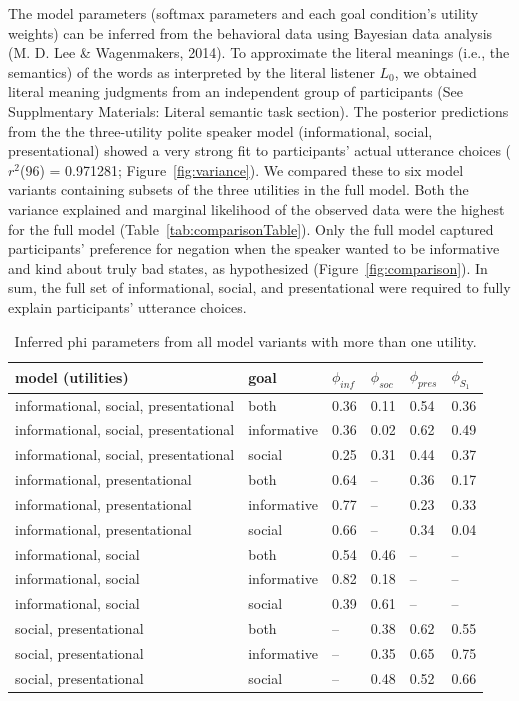 \documentclass[oneside]{report}
\begin{document}
The model parameters (softmax parameters and each goal condition's
utility weights) can be inferred from the behavioral data using Bayesian
data analysis (M. D. Lee \& Wagenmakers, 2014). To approximate the
literal meanings (i.e., the semantics) of the words as interpreted by
the literal listener \(L_0\), we obtained literal meaning judgments from
an independent group of participants (See Supplmentary Materials:
Literal semantic task section). The posterior predictions from the the
three-utility polite speaker model (informational, social,
presentational) showed a very strong fit to participants' actual
utterance choices (\(r^2\)(96) = 0.971281; Figure~\ref{fig:variance}).
We compared these to six model variants containing subsets of the three
utilities in the full model. Both the variance explained and marginal
likelihood of the observed data were the highest for the full model
(Table~\ref{tab:comparisonTable}). Only the full model captured
participants' preference for negation when the speaker wanted to be
informative and kind about truly bad states, as hypothesized
(Figure~\ref{fig:comparison}). In sum, the full set of informational,
social, and presentational were required to fully explain participants'
utterance choices.
\begin{table}[t]

\caption[Inferred phi parameters from model variants.]{\label{tab:phi}Inferred phi parameters from all model variants with more than one utility.}
\centering
\begin{tabular}{llllll}
\toprule
\textbf{model (utilities)} & \textbf{goal} & \textbf{$\phi_{inf}$} & \textbf{$\phi_{soc}$} & \textbf{$\phi_{pres}$} & \textbf{$\phi_{S_1}$}\\
\midrule
informational, social, presentational & both & 0.36 & 0.11 & 0.54 & 0.36\\
informational, social, presentational & informative & 0.36 & 0.02 & 0.62 & 0.49\\
informational, social, presentational & social & 0.25 & 0.31 & 0.44 & 0.37\\
informational, presentational & both & 0.64 & -- & 0.36 & 0.17\\
informational, presentational & informative & 0.77 & -- & 0.23 & 0.33\\
\addlinespace
informational, presentational & social & 0.66 & -- & 0.34 & 0.04\\
informational, social & both & 0.54 & 0.46 & -- & --\\
informational, social & informative & 0.82 & 0.18 & -- & --\\
informational, social & social & 0.39 & 0.61 & -- & --\\
social, presentational & both & -- & 0.38 & 0.62 & 0.55\\
\addlinespace
social, presentational & informative & -- & 0.35 & 0.65 & 0.75\\
social, presentational & social & -- & 0.48 & 0.52 & 0.66\\
\bottomrule
\end{tabular}
\end{table}
\end{document}
